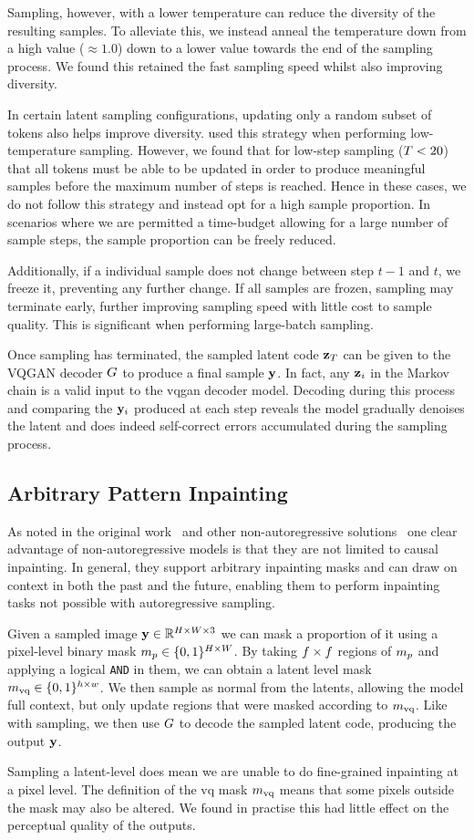 Sampling, however, with a lower temperature can reduce the diversity of the
resulting samples. To alleviate this, we instead anneal the temperature down
from a high value ($\approx 1.0$) down to a lower value towards the end of the
sampling process. We found this retained the fast sampling speed whilst also
improving diversity.

In certain latent sampling configurations, updating only a random subset of
tokens also helps improve diversity. \cite{savinov2022stepunrolled} used this
strategy when performing low-temperature sampling. However, we found that for
low-step sampling ($T<20$) that all tokens must be able to be updated
in order to produce meaningful samples before the maximum number of steps is
reached. Hence in these cases, we do not follow this strategy and instead opt
for a high sample proportion. In scenarios where we are permitted a time-budget
allowing for a large number of sample steps, the sample proportion can be freely
reduced.

Additionally, if a individual sample does not change between step $t-1$ and $t$,
we freeze it, preventing any further change. If all samples are frozen, sampling
may terminate early, further improving sampling speed with little cost to
sample quality. This is significant when performing large-batch sampling.

Once sampling has terminated, the sampled latent code $\mathbf{z}_T$ can be given
to the VQGAN decoder $G$ to produce a final sample $\mathbf{y}$. In
fact, any $\mathbf{z}_i$ in the Markov chain is a valid input to the \gls{vqgan}
decoder model. Decoding during this process and comparing the $\mathbf{y}_i$
produced at each step reveals the model gradually denoises the latent and does
indeed self-correct errors accumulated during the sampling process.

\subsection{Arbitrary Pattern Inpainting}
As noted in the original work~\cite{savinov2022stepunrolled} and other
non-autoregressive solutions~\cite{bondtaylor2021unleashing} one clear advantage
of non-autoregressive models is that they are not limited to causal inpainting.
In general, they support arbitrary inpainting masks and can draw on context in
both the past and the future, enabling them to perform inpainting tasks not
possible with autoregressive sampling.

Given a sampled image $\mathbf{y} \in \mathbb{R}^{H \times W \times 3}$ we can mask a
proportion of it using a pixel-level binary mask $m_p \in \{0, 1\}^{H
\times W}$. By taking $f \times f$ regions of
$m_p$ and applying a logical \texttt{AND} in them, we can obtain a latent level
mask $m_\textrm{vq} \in \{0,1\}^{h \times w}$. We then sample as normal from the
latents, allowing the model full context, but only update regions that were
masked according to $m_\textrm{vq}$. Like with sampling, we then use $G$
to decode the sampled latent code, producing the output $\mathbf{y}$.

Sampling a latent-level does mean we are unable to do fine-grained inpainting at
a pixel level. The definition of the \gls{vq} mask $m_\textrm{vq}$ means that some
pixels outside the mask may also be altered. We found in practise this had
little effect on the perceptual quality of the outputs.
